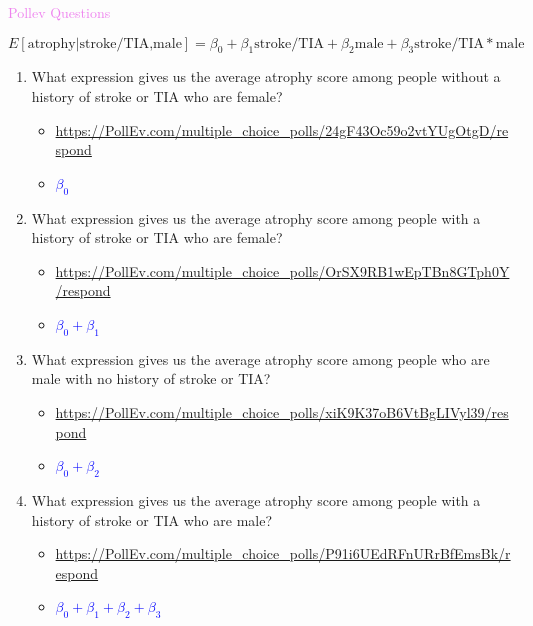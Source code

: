 \documentclass[10pt,t]{beamer}
\begin{document}
\begin{frame}{\textcolor{violet}{Pollev Questions}}
	
	\vspace{-10 mm}
	\small
	\[E[\text{atrophy}|\text{stroke/TIA,male}]=\beta_0+\beta_1\text{stroke/TIA}+\beta_2\text{male}+{\beta_3}\text{stroke/TIA}*\text{male}\]
	
	\normalsize
	\smallskip
	\begin{enumerate}
		\item What expression gives us the average atrophy score among people without a history of stroke or TIA who are female?
		\begin{itemize}
			\smallskip
			\item{\tiny\url{https://PollEv.com/multiple_choice_polls/24gF43Oc59o2vtYUgOtgD/respond}}\pause
			\item \textcolor{blue}{$\beta_0$}\pause
		\end{itemize}
		\medskip
		\item What expression gives us the average atrophy score among people with a history of stroke or TIA who are female?
		\begin{itemize}
			\smallskip
			\item{\tiny\url{https://PollEv.com/multiple_choice_polls/OrSX9RB1wEpTBn8GTph0Y/respond}}\pause
			\item \textcolor{blue}{$\beta_0+\beta_1$}\pause
		\end{itemize}
	\medskip
	\item What expression gives us the average atrophy score among people who are male with no history of stroke or TIA?
	\begin{itemize}
		\smallskip
		\item{\tiny\url{https://PollEv.com/multiple_choice_polls/xiK9K37oB6VtBgLIVyl39/respond}}\pause
		\item \textcolor{blue}{$\beta_0+\beta_2$}\pause
	\end{itemize}
\medskip
	\item What expression gives us the average atrophy score among people with a history of stroke or TIA who are male?
	\begin{itemize}
		\smallskip
		\item{\tiny\url{https://PollEv.com/multiple_choice_polls/P91i6UEdRFnURrBfEmsBk/respond}}\pause
		\item \textcolor{blue}{$\beta_0+\beta_1+\beta_2+\beta_3$}\pause
	\end{itemize}
	\end{enumerate}
	
	
\end{frame}
\end{document}
